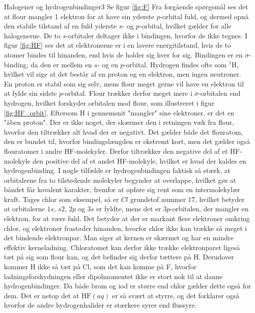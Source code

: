 \begin{opgave}{Halogener og hydrogenbindinger}{3}
\opg Se figur \ref{fig:F}
\opg Fra forgående spørgsmål ses det at flour mangler 1 elektron for at have sin yderste $p$-orbital fuld, og dermed opnå den stabile tilstand af en fuld yderste $s$- og $p$-orbital, hvilket gælder for alle halogenerne.
\opg De to $s$-orbitaler deltager ikke i bindingen, hvorfor de ikke tegnes. I figur \ref{fig:HF} ses det at elektronerne er i en lavere energitilstand, hvis de to atomer bindes til hinanden, end hvis de holder sig hver for sig.
\opg Bindingen er en $\sigma$-binding, da den er mellem en $s$- og en $p$-orbital.
\opg Hydrogen findes ofte som ${}^1$H, hvilket vil sige at det består af en proton og en elektron, men ingen neutroner. En proton er stabil som sig selv, mens flour meget gerne vil have en elektron til at fylde sin sidste $p$-orbital. Flour trækker derfor meget mere i $\sigma$-orbitalen end hydrogen, hvilket forskyder orbitalen mod flour, som illustreret i figur \ref{fig:HF_orbit}.
\opg Eftersom H i gennemsnit "mangler" sine elektroner, er det en "åben proton". Der er ikke noget, der skærmer den i retningen væk fra flour, hvorfor den tiltrækker alt hvad der er negativt. Det gælder både det flouratom, den er bundet til, hvorfor bindingslængden er ekstremt kort, men det gælder også flouratomer i andre HF-molekyler. Derfor tiltrækker den negative del af et HF-molekyle den positive del af et andet HF-molekyle, hvilket er hvad der kaldes en hydrogenbinding. I nogle tilfælde er hydrogenbindingen faktisk så stærk, at orbitalerne fra to tilstødende molekyler begynder at overlappe, hvilket gør at båndet får kovalent karakter, fremfor at opføre sig rent som en intermolekylær kraft.
\opg Tages chlor som eksempel, så er $Cl$ grundstof nummer 17, hvilket betyder at orbitalerne $1s$, $s2$, $2p$ og $3s$ er fyldte, mens det er $3p$-orbitalen, der mangler en elektron, for at være fuld. Det betyder at der er markant flere elektroner omkring chlor, og elektroner frastøder hinanden, hvorfor chlor ikke kan trække så meget i det bindende elektronpar. Man siger at kernen er skærmet og har en mindre effektiv kerneladning. Chloratomet kan derfor ikke trække elektronparet ligeså tæt på sig som flour kan, og det befinder sig derfor tættere på H. Derudover kommer H ikke så tæt på Cl, som det kan komme på F, hvorfor ladningsforskydningen eller dipolmomentet ikke er stort nok til at danne hydrogenbindinger. Da både brom og iod er større end chlor gælder dette også for dem. Det er netop det at $\mathrm{HF}(aq)$ er så svært at styrre, og det forklarer også hvorfor de andre hydrogenhalider er stærkere syrer end flussyre.
\end{opgave}